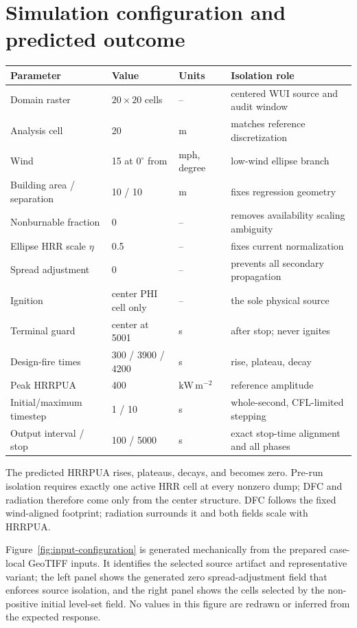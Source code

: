 \section{Simulation configuration and predicted outcome}

\begin{center}
\small
\begin{tabular}{@{}llll@{}}\toprule
Parameter & Value & Units & Isolation role\\\midrule
Domain raster & \(20\times20\) cells & -- & centered WUI source and audit window\\
Analysis cell & 20 & m & matches reference discretization\\
Wind & 15 at \(0^\circ\) from & mph, degree & low-wind ellipse branch\\
Building area / separation & 10 / 10 & m & fixes regression geometry\\
Nonburnable fraction & 0 & -- & removes availability scaling ambiguity\\
Ellipse HRR scale \(\eta\) & 0.5 & -- & fixes current normalization\\
Spread adjustment & 0 & -- & prevents all secondary propagation\\
Ignition & center PHI cell only & -- & the sole physical source\\
Terminal guard & center at 5001 & s & after stop; never ignites\\
Design-fire times & 300 / 3900 / 4200 & s & rise, plateau, decay\\
Peak HRRPUA & 400 & \(\mathrm{kW\,m^{-2}}\) & reference amplitude\\
Initial/maximum timestep & 1 / 10 & s & whole-second, CFL-limited stepping\\
Output interval / stop & 100 / 5000 & s & exact stop-time alignment and all phases\\
\bottomrule\end{tabular}
\end{center}
The predicted HRRPUA rises, plateaus, decays, and becomes zero. Pre-run isolation requires exactly one active HRR cell at every nonzero dump; DFC and radiation therefore come only from the center structure. DFC follows the fixed wind-aligned footprint; radiation surrounds it and both fields scale with HRRPUA.

Figure~\ref{fig:input-configuration} is generated mechanically from the prepared case-local GeoTIFF inputs. It identifies the selected source artifact and representative variant; the left panel shows the generated zero spread-adjustment field that enforces source isolation, and the right panel shows the cells selected by the non-positive initial level-set field. No values in this figure are redrawn or inferred from the expected response.

